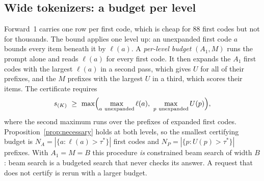 \documentclass[sigconf,anonymous]{acmart}
\newcommand{\lp}{\ell}
\newcommand{\U}{U}
\begin{document}
\subsection{Wide tokenizers: a budget per level}
\label{sec:budget}
Forward~1 carries one row per first code, which is cheap for 88 first codes but not for thousands. The bound applies
one level up: an unexpanded first code $a$ bounds every item beneath it by $\lp(a)$. A \emph{per-level budget}
$(A_1,M)$ runs the prompt alone and reads $\lp(a)$ for every first code. It then expands the $A_1$ first codes with
the largest $\lp(a)$ in a second pass, which gives $\U$ for all of their prefixes, and the $M$ prefixes with the
largest $\U$ in a third, which scores their items. The certificate requires
\begin{equation}
s_{(K)}\ \ge\ \max\Bigl(\max_{a\ \text{unexpanded}}\lp(a),\ \max_{p\ \text{unexpanded}}\U(p)\Bigr),
\label{eq:cert2}
\end{equation}
where the second maximum runs over the prefixes of expanded first codes. Proposition~\ref{prop:necessary} holds at
both levels, so the smallest certifying budget is $N_A=|\{a:\lp(a)>\tau^*\}|$ first codes and
$N_P=|\{p:\U(p)>\tau^*\}|$ prefixes. With $A_1=M=B$ this procedure \emph{is} constrained beam search of width $B$:
beam search is a budgeted search that never checks its answer. A request that does not certify is rerun with a
larger budget.
\end{document}
